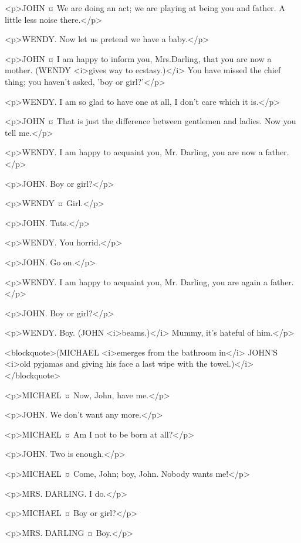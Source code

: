 <p>JOHN ¤
We are doing an act; we are playing at being you and father.
A little less noise there.</p>

<p>WENDY. Now let us pretend we have a baby.</p>

<p>JOHN ¤
I am happy to inform you, Mrs.Darling, that you are now a mother. (WENDY <i>gives way to ecstasy.)</i> You have missed the chief thing; you haven't asked, 'boy or girl?'</p>

<p>WENDY. I am so glad to have one at all, I don't care which it is.</p>

<p>JOHN ¤
That is just the difference between gentlemen and ladies. Now you tell me.</p>

<p>WENDY. I am happy to acquaint you, Mr. Darling, you are now a father.</p>

<p>JOHN. Boy or girl?</p>

<p>WENDY ¤
Girl.</p>

<p>JOHN. Tuts.</p>

<p>WENDY. You horrid.</p>

<p>JOHN. Go on.</p>

<p>WENDY. I am happy to acquaint you, Mr. Darling, you are again a father.</p>

<p>JOHN. Boy or girl?</p>

<p>WENDY. Boy. (JOHN <i>beams.)</i> Mummy, it's hateful of him.</p>

<blockquote>(MICHAEL <i>emerges from the bathroom in</i> JOHN'S <i>old pyjamas and giving his face a last wipe with the towel.)</i></blockquote>

<p>MICHAEL ¤
Now, John, have me.</p>

<p>JOHN. We don't want any more.</p>

<p>MICHAEL ¤
Am I not to be born at all?</p>

<p>JOHN. Two is enough.</p>

<p>MICHAEL ¤
Come, John; boy, John.
Nobody wants me!</p>

<p>MRS. DARLING. I do.</p>

<p>MICHAEL ¤
Boy or girl?</p>

<p>MRS. DARLING ¤
Boy.</p>

